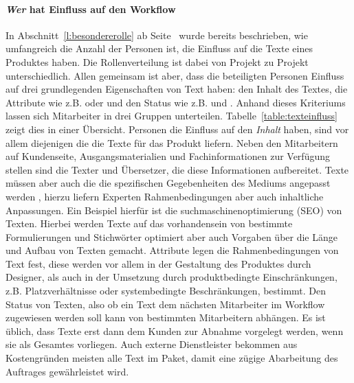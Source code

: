 \paragraph{\emph{Wer} hat Einfluss auf den Workflow} In Abschnitt~\ref{l:besondererolle} ab Seite~\pageref{l:besondererolle} wurde bereits beschrieben, wie umfangreich die Anzahl der Personen ist, die Einfluss auf die Texte eines Produktes haben. Die Rollenverteilung ist dabei von Projekt zu Projekt unterschiedlich. Allen gemeinsam ist aber, dass die beteiligten Personen  Einfluss auf drei grundlegenden Eigenschaften von Text haben: den Inhalt des Textes, die Attribute wie z.B.  oder  und den Status wie z.B.  und . Anhand dieses Kriteriums lassen sich Mitarbeiter in drei Gruppen unterteilen. Tabelle~\ref{table:texteinfluss} zeigt dies in einer Übersicht. Personen die Einfluss auf den \emph{Inhalt} haben, sind vor allem diejenigen die die Texte für das Produkt liefern. Neben den Mitarbeitern auf Kundenseite, Ausgangsmaterialien und Fachinformationen zur Verfügung stellen sind die Texter und Übersetzer, die diese Informationen aufbereitet. Texte müssen aber auch die die spezifischen Gegebenheiten des Mediums angepasst werden , hierzu liefern Experten Rahmenbedingungen aber auch inhaltliche Anpassungen. Ein Beispiel hierfür ist die suchmaschinenoptimierung (SEO) von Texten. Hierbei werden Texte auf das vorhandensein von bestimmte Formulierungen und Stichwörter optimiert aber auch Vorgaben über die Länge und Aufbau von Texten gemacht. Attribute legen die Rahmenbedingungen von Text fest, diese werden vor allem in der Gestaltung des Produktes durch Designer, als auch in der Umsetzung durch produktbedingte Einschränkungen, z.B. Platzverhältnisse oder systembedingte Beschränkungen, bestimmt. Den Status von Texten, also ob ein Text dem nächsten Mitarbeiter im Workflow zugewiesen werden soll kann von bestimmten Mitarbeitern abhängen. Es ist üblich, dass Texte erst dann dem Kunden zur Abnahme vorgelegt werden, wenn sie als Gesamtes vorliegen. Auch externe Dienstleister bekommen aus Kostengründen meisten alle Text im Paket, damit eine zügige Abarbeitung des Auftrages gewährleistet wird.

